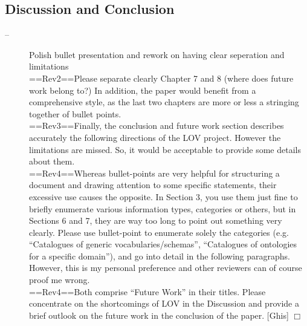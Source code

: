 \documentclass[a4paper,notitlepage]{article}
\newcommand\todo[2]{\item[--] #1 \hfill[#2] $\Box$}%
\begin{document}
\subsection{Discussion and Conclusion}
\begin{description}
 \todo{Polish bullet presentation and rework on having clear seperation and limitations \\
==Rev2==Please separate clearly Chapter 7 and 8 (where does future work belong to?) In addition, the paper would benefit from a comprehensive style, as the last two chapters are more or less a stringing together of bullet points.\\
==Rev3==Finally, the conclusion and future work section describes accurately the following directions of the LOV project. However the limitations are missed. So, it would be acceptable to provide some details about them.\\
==Rev4==Whereas bullet-points are very helpful for structuring a document and drawing attention to some specific statements, their excessive use causes the opposite. In Section 3, you use them just fine to briefly enumerate various information types, categories or others, but in Sections 6 and 7, they are way too long to point out something very clearly. Please use bullet-point to enumerate solely the categories (e.g. “Catalogues of generic vocabularies/schemas”, “Catalogues of ontologies for a specific domain”), and go into detail in the following paragraphs. However, this is my personal preference and other reviewers can of course proof me wrong.\\
==Rev4==Both comprise “Future Work” in their titles. Please concentrate on the shortcomings of LOV in the Discussion and provide a brief outlook on the future work in the conclusion of the paper.}{Ghis}
\end{description}
\end{document}
